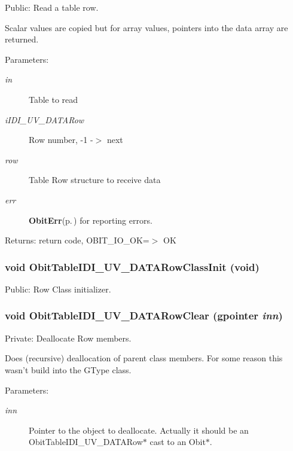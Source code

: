 Public: Read a table row. 

Scalar values are copied but for array values, pointers into the data array are returned. \begin{Desc}
\item[Parameters:]
\begin{description}
\item[{\em in}]Table to read \item[{\em i\-IDI\_\-UV\_\-DATARow}]Row number, -1 -$>$ next \item[{\em row}]Table Row structure to receive data \item[{\em err}]{\bf Obit\-Err}{\rm (p.\,\pageref{structObitErr})} for reporting errors. \end{description}
\end{Desc}
\begin{Desc}
\item[Returns:]return code, OBIT\_\-IO\_\-OK=$>$ OK \end{Desc}
\subsubsection{\setlength{\rightskip}{0pt plus 5cm}void Obit\-Table\-IDI\_\-UV\_\-DATARow\-Class\-Init (void)}\label{ObitTableIDI__UV__DATA_8c_a26}


Public: Row Class initializer. 

\subsubsection{\setlength{\rightskip}{0pt plus 5cm}void Obit\-Table\-IDI\_\-UV\_\-DATARow\-Clear (gpointer {\em inn})}\label{ObitTableIDI__UV__DATA_8c_a7}


Private: Deallocate Row members. 

Does (recursive) deallocation of parent class members. For some reason this wasn't build into the GType class. \begin{Desc}
\item[Parameters:]
\begin{description}
\item[{\em inn}]Pointer to the object to deallocate. Actually it should be an Obit\-Table\-IDI\_\-UV\_\-DATARow$\ast$ cast to an Obit$\ast$. \end{description}
\end{Desc}
